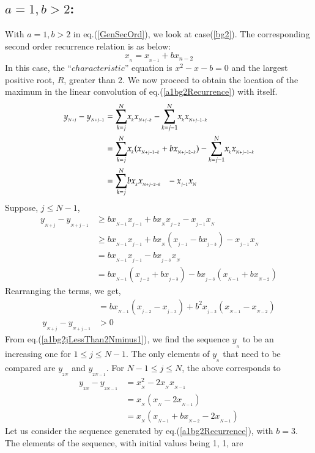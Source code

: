 \begin{multicols}{2}
\section{\underline{$a=1, b > 2$}:}\label{section-18}
With $a=1, b > 2$ in eq.(\ref{GenSecOrd}), we look at case(\ref{bg2}). The corresponding second order recurrence relation is as below:
\begin{equation}
x_{_n} =  x_{_{n-1}} + bx_{{n-2}}\label{eq-18.1}
\end{equation}
In this case, the ``$characteristic$'' equation is $x^2 - x - b = 0$ and the largest positive root, $R$, greater than 2. We now proceed to obtain the location of the maximum in the linear convolution of eq.(\ref{a1bg2Recurrence}) with itself.
{\fontsize{9}{10}\selectfont\begin{align}
y_{_{N+j}} - y_{_{N+j-1}} &= \displaystyle{\sum_{k=j}^{N}}x_{_{k}}x_{_{N+j-k}} -  \displaystyle{\sum_{k=j-1}^{N}}x_{_k}x_{_{N+j-1-k}}\nonumber\\
&= \displaystyle{\sum_{k=j}^{N}}x_{_{k}}(x_{_{N+j-1-k}}+b x_{_{N+j-2-k}}) -  \displaystyle{\sum_{k=j-1}^{N}}x_{_k}x_{_{N+j-1-k}}\nonumber\\
&= \displaystyle{\sum_{k=j}^{N}}bx_{_{k}}x_{_{N+j-2-k}} \hspace{0.1in}- x_{_{j-1}}x_{_N}\label{eq-18.2}
\end{align}}
Suppose, $j \leq N-1$,
\begin{align}
y_{_{N+j}} - y_{_{N+j-1}}&\geq bx_{_{N-1}}x_{_{j-1}} + b x_{_N}x_{_{j-2}} - x_{_{j-1}}x_{_N}\nonumber\\
&\geq bx_{_{N-1}}x_{_{j-1}} + b x_{_N}(x_{_{j-1}}- b x_{_{j-3}})- x_{_{j-1}}x_{_N}\nonumber\\
&= bx_{_{N-1}}x_{_{j-1}} - bx_{_{j-3}}x_{_N}\nonumber\\
&= bx_{_{N-1}}(x_{_{j-2}} + bx_{_{j-3}}) - b x_{_{j-3}}(x_{_{N-1}} + bx_{_{N-2}})\nonumber
\end{align}
Rearranging the terms, we get,
\begin{align}
&= bx_{_{N-1}}(x_{_{j-2}} - x_{_{j-3}}) + b^2x_{_{j-3}}(x_{_{N-1}} - x_{_{N-2}})\label{eq-18.3}\\
y_{_{N+j}} - y_{_{N+j-1}}&> 0\label{eq-18.4}
\end{align}
From eq.(\ref{a1bg2jLessThan2Nminus1}), we find the sequence $y_{_n}$ to be an increasing one for $1 \leq j \leq N-1$. The only elements of $y_{_n}$ that need to be compared are $y_{_{2N}}$ and $y_{_{2N-1}}$.
For\hspace{0.1in} $N-1 \leq j \leq N$,\hspace{0.1in} the above corresponds to
\begin{align}
y_{_{2N}} - y_{_{2N-1}} &= x_{_N}^2 - 2x_{_N}x_{_{N-1}}\label{eq-18.5}\\
&= x_{_N}(x_{_N} - 2x_{_{N-1}})\label{eq-18.6}\\
&= x_{_N}(x_{_{N-1}}+ b x_{_{N-2}}- 2x_{_{N-1}})\label{eq-18.7}
\end{align} 
Let us consider the sequence generated by eq.(\ref{a1bg2Recurrence}), with $b=3$. The elements of the sequence, with initial values being 1, 1, are


\end{multicols}
